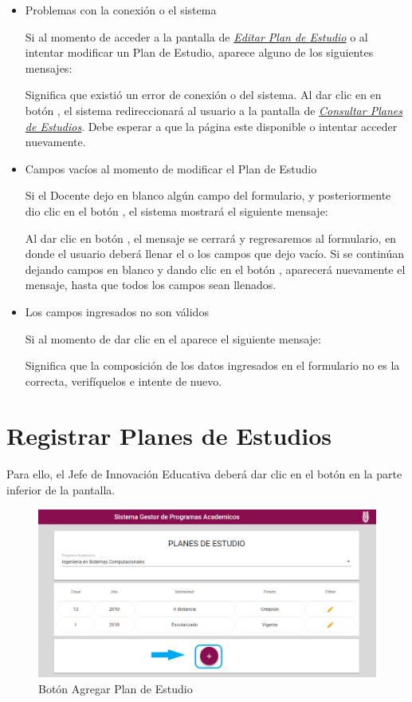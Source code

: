\begin{itemize}
	\item Problemas con la conexión o el sistema

	Si al momento de acceder a la pantalla de \hyperlink{editarPE}{\textit{Editar Plan de Estudio}} o al intentar modificar un Plan de Estudio, aparece alguno de los siguientes mensajes:


	Significa que existió un error de conexión o del sistema. Al dar clic en en botón  , el sistema redireccionará al usuario a la pantalla de \hyperlink{consultarPE}{\textit{Consultar Planes de Estudios}}. Debe esperar a que la página este disponible o intentar acceder nuevamente.

	\item Campos vacíos al momento de modificar el Plan de Estudio

	Si el Docente dejo en blanco algún campo del formulario, y posteriormente dio clic en el botón  , el sistema mostrará el siguiente mensaje:


	Al dar clic en botón  , el mensaje se cerrará y regresaremos al formulario, en donde el usuario deberá llenar el o los campos que dejo vacío. Si se continúan dejando campos en blanco y dando clic en el botón  , aparecerá nuevamente el mensaje, hasta que todos los campos sean llenados.

	\item Los campos ingresados no son válidos

	Si al momento de dar clic en el  aparece el siguiente mensaje:

	Significa que la composición de los datos ingresados en el formulario no es la correcta, verifíquelos e intente de nuevo.

\end{itemize}




\newpage
\section{Registrar Planes de Estudios}

Para ello, el Jefe de Innovación Educativa deberá dar clic en el botón \IUbutton{+} en la parte inferior de la pantalla.

\begin{figure}[!hbtp]
    \centering
    \hypertarget{add}{\includegraphics[width=0.7\linewidth]{images/SP4-GPE/mas}}
    \caption{Botón Agregar Plan de Estudio}
    \label{add}
\end{figure}

